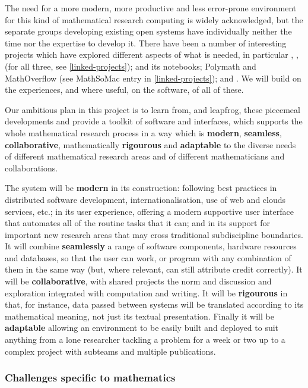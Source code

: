 The need for a more modern, more productive and less error-prone
environment for this kind of mathematical research computing is widely
acknowledged, but the separate groups developing existing open systems have
individually neither the time nor the expertise to develop it. There
have been a number of interesting projects which have explored
different aspects of what is needed, in particular
\SMC, \HPCGAP, \scienceproject (for all three, see \ref{linked-projects});
\Sage and its notebooks;
Polymath and MathOverflow (see MathSoMac entry in \ref{linked-projects});
and .
We will build on the experiences, and where useful, on the software,
of all of these.

Our ambitious plan in this project is to learn from, and leapfrog,
these piecemeal developments and provide a toolkit of software and
interfaces, which supports the whole mathematical research process in
a way which is \textbf{modern}, \textbf{seamless},
\textbf{collaborative}, mathematically \textbf{rigourous} and
\textbf{adaptable} to the diverse needs of different mathematical
research areas and of different mathematicians and collaborations.

The system will be \textbf{modern} in its construction: following best
practices in distributed software development, internationalisation,
use of web and clouds services, etc.; in its user experience, offering
a modern supportive user interface that automates all of the routine
tasks that it can; and in its support for important new research areas
that may cross traditional subdiscipline boundaries. It will combine
\textbf{seamlessly} a range of software components, hardware resources
and databases, so that the user can work, or program with any
combination of them in the same way (but, where relevant, can still
attribute credit correctly). It will be \textbf{collaborative}, with
shared projects the norm and discussion and exploration integrated
with computation and writing. It will be \textbf{rigourous} in that,
for instance, data passed between systems will be translated according
to its mathematical meaning, not just its textual
presentation. Finally it will be \textbf{adaptable} allowing an
environment to be easily built and deployed to suit anything from a
lone researcher tackling a problem for a week or two up to a complex
project with subteams and multiple publications.


\subsubsection{Challenges specific to  mathematics}

